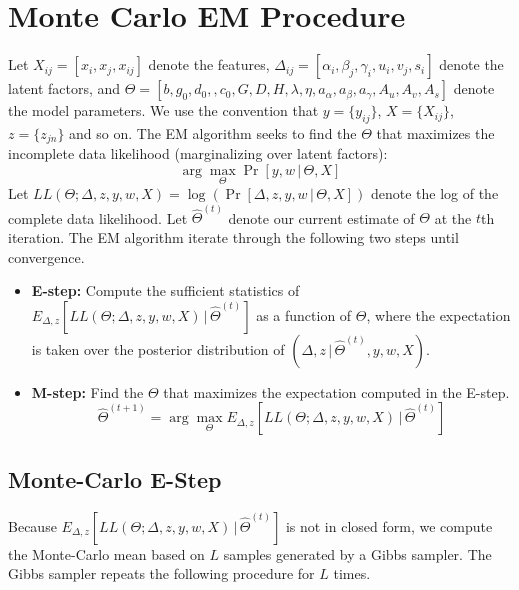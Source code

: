 \section{Monte Carlo EM Procedure}

Let $X_{ij} = [x_i, x_j, x_{ij}]$ denote the features, $\Delta_{ij} = [\alpha_i, \beta_j, \gamma_i, u_i, v_j, s_i]$ denote the latent factors, and
$\Theta = [b, g_0, d_0,, c_0, G, D, H, \lambda, \eta, a_\alpha, a_\beta, a_\gamma, A_u, A_v, A_s]$ denote the model parameters. We use the convention that $y = \{y_{ij}\}$, $X = \{X_{ij}\}$, $z = \{z_{jn}\}$ and so on. The EM algorithm seeks to find the $\Theta$ that maximizes the incomplete data likelihood (marginalizing over latent factors):
$$
\arg\max_{\Theta} \Pr[y, w \,|\, \Theta, X]
$$
Let $LL(\Theta; \Delta, z, y, w, X) = \log(\Pr[\Delta, z, y, w \,|\, \Theta, X])$ denote the log of the complete data likelihood. Let $\hat{\Theta}^{(t)}$ denote our current estimate of $\Theta$ at the $t$th iteration. The EM algorithm iterate through the following two steps until convergence.

\begin{itemize}
\item {\bf E-step:} Compute the sufficient statistics of $E_{\Delta, z}[LL(\Theta; \Delta, z, y, w, X) \,|\, \hat{\Theta}^{(t)}]$ as a function of $\Theta$, where the expectation is taken over the posterior distribution of $(\Delta, z \,|\, \hat{\Theta}^{(t)}, y, w, X)$.

\item {\bf M-step:} Find the $\Theta$ that maximizes the expectation computed in the E-step.
$$
\hat{\Theta}^{(t+1)}= \arg\max_{\Theta}
 E_{\Delta, z}[LL(\Theta; \Delta, z, y, w, X) \,|\, \hat{\Theta}^{(t)}]
$$
\end{itemize}

\subsection{Monte-Carlo E-Step}

Because $E_{\Delta, z}[LL(\Theta; \Delta, z, y, w, X) \,|\, \hat{\Theta}^{(t)}]$ is not in closed form, we compute the Monte-Carlo mean based on $L$ samples generated by a Gibbs sampler. The Gibbs sampler repeats the following procedure for $L$ times.

